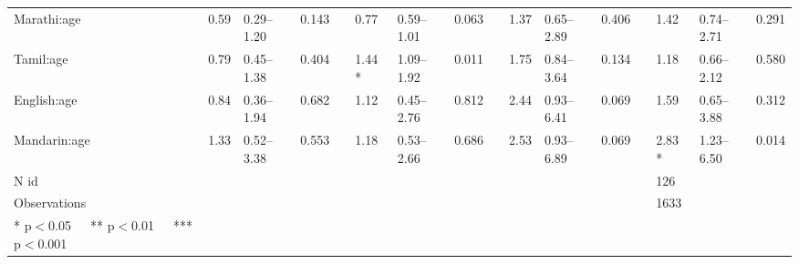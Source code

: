\begin{table}[ht]
\begin{tabular}{}
Marathi:age & 0.59 & 0.29--1.20 & 0.143 &  & 0.77 & 0.59--1.01 & 0.063 &  & 1.37 & 0.65--2.89 & 0.406 &  & 1.42 & 0.74--2.71 & 0.291 \\ 

Tamil:age & 0.79 & 0.45--1.38 & 0.404 &  & 1.44 * & 1.09--1.92 & 0.011 &  & 1.75 & 0.84--3.64 & 0.134 &  & 1.18 & 0.66--2.12 & 0.580 \\ 

English:age & 0.84 & 0.36--1.94 & 0.682 &  & 1.12 & 0.45--2.76 & 0.812 &  & 2.44 & 0.93--6.41 & 0.069 &  & 1.59 & 0.65--3.88 & 0.312 \\ 

Mandarin:age & 1.33 & 0.52--3.38 & 0.553 &  & 1.18 & 0.53--2.66 & 0.686 &  & 2.53 & 0.93--6.89 & 0.069 &  & 2.83 * & 1.23--6.50 & 0.014 \\ 

N id &  &  &  &  &  &  &  &  &  &  &  &  & 126 &  &  \\ 

Observations &  &  &  &  &  &  &  &  &  &  &  &  & 1633 &  &  \\ 

* p$<$0.05   ** p$<$0.01   *** p$<$0.001 &  &  &  &  &  &  &  &  &  &  &  &  &  &  &  \\ 
   \hline
\end{tabular}
\end{table}
